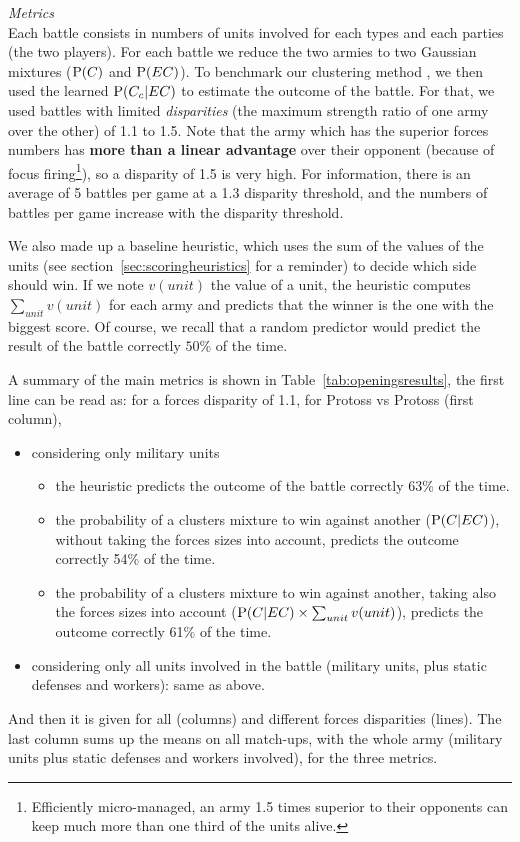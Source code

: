\vspace{0.2cm}
\textit{Metrics}\\
Each battle consists in numbers of units involved for each types and each parties (the two players). For each battle we reduce the two armies to two Gaussian mixtures ($\mathrm{P}(C)$ and $\mathrm{P}(EC)$). To benchmark our clustering method%
, %
we then used the learned $\mathrm{P}(C_c|EC)$ to estimate the outcome of the battle. For that, we used battles with limited \textit{disparities} (the maximum strength ratio of one army over the other) of 1.1 to 1.5. Note that the army which has the superior forces numbers has \textbf{more than a linear advantage} over their opponent (because of focus firing\footnote{Efficiently micro-managed, an army 1.5 times superior to their opponents can keep much more than one third of the units alive.}), so a disparity of 1.5 is very high. For information, there is an average of 5 battles per game at a 1.3 disparity threshold, and the numbers of battles per game increase with the disparity threshold.

We also made up a baseline heuristic, which uses the sum of the values of the units (see section~\ref{sec:scoringheuristics} for a reminder) to decide which side should win. If we note $v(unit)$ the value of a unit, the heuristic computes $\sum_{unit} v(unit)$ for each army and predicts that the winner is the one with the biggest score. Of course, we recall that a random predictor would predict the result of the battle correctly $50\%$ of the time.

A summary of the main metrics is shown in Table~\ref{tab:openingsresults}, the first line can be read as: for a forces disparity of 1.1, for Protoss vs Protoss (first column),
\begin{itemize}
    \item considering only military units
\begin{itemize}
    \item the heuristic predicts the outcome of the battle correctly 63\% of the time.
    \item the probability of a clusters mixture to win against another ($\mathrm{P}(C|EC)$), without taking the forces sizes into account, predicts the outcome correctly 54\% of the time.
    \item the probability of a clusters mixture to win against another, taking also the forces sizes into account ($\mathrm{P}(C|EC)\times \sum_{unit}v(unit)$), predicts the outcome correctly 61\% of the time.
\end{itemize}
    \item considering only all units involved in the battle (military units, plus static defenses and workers): same as above.
\end{itemize}
And then it is given for all  (columns) and different forces disparities (lines). The last column sums up the means on all match-ups, with the whole army (military units plus static defenses and workers involved), for the three metrics.

